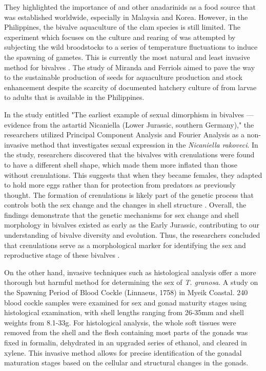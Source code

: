 They highlighted the importance of \Tgranosa and other anadarinids as a food source that was established worldwide, especially in Malaysia and Korea. However, in the Philippines, the bivalve aquaculture of the clam species is still limited. The experiment which focuses on the culture and rearing of \Tgranosa was attempted by subjecting the wild broodstocks to a series of temperature fluctuations to induce the spawning of gametes. This is currently the most natural and least invasive method for bivalves \cite{aji}. The study of Miranda and Ferriols aimed to pave the way to the sustainable production of \Tgranosa seeds for aquaculture production and stock enhancement despite the scarcity of documented hatchery culture of \Tgranosa from larvae to adults that is available in the Philippines.

In the study entitled "The earliest example of sexual dimorphism in bivalves — evidence from the astartid Nicaniella (Lower Jurassic, southern Germany)," the researchers utilized Principal Component Analysis and Fourier Analysis as a non-invasive method that investigates sexual expression in the \textit{Nicaniella rakoveci}. In the study, researchers discovered that the bivalves with crenulations were found to have a different shell shape, which made them more inflated than those without crenulations. This suggests that when they became females, they adapted to hold more eggs rather than for protection from predators as previously thought. The formation of crenulations is likely part of the genetic process that controls both the sex change and the changes in shell structure \cite{karapunar2021}. Overall, the findings demonstrate that the genetic mechanisms for sex change and shell morphology in bivalves existed as early as the Early Jurassic, contributing to our understanding of bivalve diversity and evolution. Thus, the researchers concluded that crenulations serve as a morphological marker for identifying the sex and reproductive stage of these bivalves \cite{karapunar2021}.

On the other hand, invasive techniques such as histological analysis offer a more thorough but harmful method for determining the sex of \textit{T. granosa}. A study on the Spawning Period of Blood Cockle \Tegillarcagranosa (Linnaeus, 1758) in Myeik Coastal. 240 blood cockle samples were examined for sex and gonad maturity stages using histological examination, with shell lengths ranging from 26-35mm and shell weights from 8.1-33g. For histological analysis, the whole soft tissues were removed from the shell and the flesh containing most parts of the gonads was fixed in formalin, dehydrated in an upgraded series of ethanol, and cleared in xylene. This invasive method allows for precise identification of the gonadal maturation stages based on the cellular and structural changes in the gonads.

